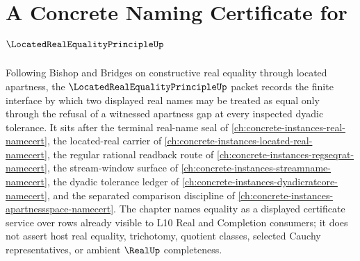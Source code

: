 \chapter{A Concrete Naming Certificate for $\LocatedRealEqualityPrincipleUp$}
\label{ch:concrete-instances-located-real-equality-principle-namecert}

Following Bishop and Bridges on constructive real equality through located apartness, the $\LocatedRealEqualityPrincipleUp$ packet records the finite interface by which two displayed real names may be treated as equal only through the refusal of a witnessed apartness gap at every inspected dyadic tolerance. It sits after the terminal real-name seal of \autoref{ch:concrete-instances-real-namecert}, the located-real carrier of \autoref{ch:concrete-instances-located-real-namecert}, the regular rational readback route of \autoref{ch:concrete-instances-regseqrat-namecert}, the stream-window surface of \autoref{ch:concrete-instances-streamname-namecert}, the dyadic tolerance ledger of \autoref{ch:concrete-instances-dyadicratcore-namecert}, and the separated comparison discipline of \autoref{ch:concrete-instances-apartnessspace-namecert}. The chapter names equality as a displayed certificate service over rows already visible to L10 Real and Completion consumers; it does not assert host real equality, trichotomy, quotient classes, selected Cauchy representatives, or ambient $\RealUp$ completeness.

